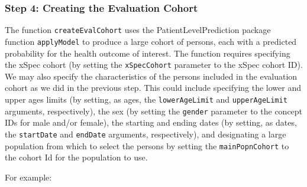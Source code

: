 \documentclass[11pt]{book}
\theoremstyle{definition}
\theoremstyle{definition}
\theoremstyle{definition}
\theoremstyle{remark}
\begin{document}
\subsubsection*{Step 4: Creating the Evaluation
Cohort}\label{step-4-creating-the-evaluation-cohort}

The function \texttt{createEvalCohort} uses the PatientLevelPrediction
package function \texttt{applyModel} to produce a large cohort of
persons, each with a predicted probability for the health outcome of
interest. The function requires specifying the xSpec cohort (by setting
the \texttt{xSpecCohort} parameter to the xSpec cohort ID). We may also
specify the characteristics of the persons included in the evaluation
cohort as we did in the previous step. This could include specifying the
lower and upper ages limits (by setting, as ages, the
\texttt{lowerAgeLimit} and \texttt{upperAgeLimit} arguments,
respectively), the sex (by setting the \texttt{gender} parameter to the
concept IDs for male and/or female), the starting and ending dates (by
setting, as dates, the \texttt{startDate} and \texttt{endDate}
arguments, respectively), and designating a large population from which
to select the persons by setting the \texttt{mainPopnCohort} to the
cohort Id for the population to use.

For example:
\end{document}
